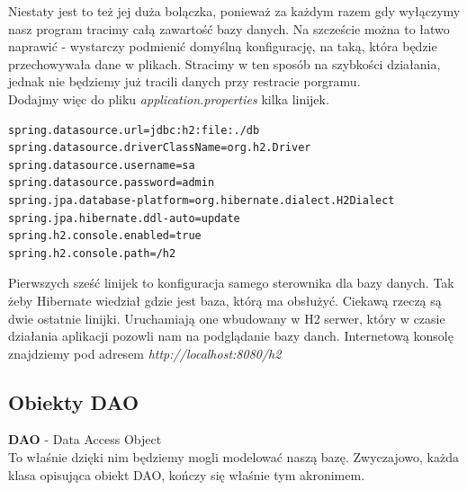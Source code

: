 \documentclass{article}
\begin{document}
            Niestaty jest to też jej duża bolączka, ponieważ za każdym razem gdy wyłączymy nasz program tracimy całą zawartość bazy danych. Na szczeście można to łatwo naprawić - wystarczy podmienić domyślną konfigurację, na taką, która będzie przechowywała dane w plikach. Stracimy w ten sposób na szybkości działania, jednak nie będziemy już tracili danych przy restracie porgramu. \\
            Dodajmy więc do pliku \emph{application.properties} kilka linijek.
            \begin{verbatim}
spring.datasource.url=jdbc:h2:file:./db
spring.datasource.driverClassName=org.h2.Driver
spring.datasource.username=sa
spring.datasource.password=admin
spring.jpa.database-platform=org.hibernate.dialect.H2Dialect
spring.jpa.hibernate.ddl-auto=update
spring.h2.console.enabled=true
spring.h2.console.path=/h2
            \end{verbatim}
            Pierwszych sześć linijek to konfiguracja samego sterownika dla bazy danych. Tak żeby Hibernate wiedział gdzie jest baza, którą ma obsłużyć. Ciekawą rzeczą są dwie ostatnie linijki. Uruchamiają one wbudowany w H2 serwer, który w czasie działania aplikacji pozowli nam na podglądanie bazy danch. Internetową konsolę znajdziemy pod adresem \emph{http://localhost:8080/h2}
        
        \subsection{Obiekty DAO}
            \textbf{DAO} - Data Access Object \\
            To właśnie dzięki nim będziemy mogli modelować naszą bazę. Zwyczajowo, każda klasa opisująca obiekt DAO, kończy się właśnie tym akronimem. 
\end{document}
